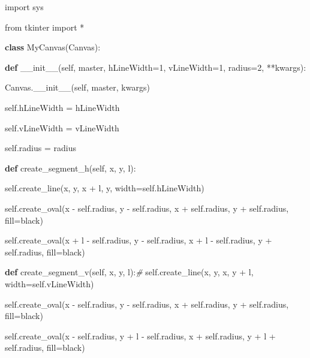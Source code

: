 \documentclass[
]{article}
\author{}
\date{}
\newenvironment{Shaded}{}{}
\newcommand{\CommentTok}[1]{\textcolor[rgb]{0.38,0.63,0.69}{\textit{#1}}}
\newcommand{\DecValTok}[1]{\textcolor[rgb]{0.25,0.63,0.44}{#1}}
\newcommand{\FunctionTok}[1]{\textcolor[rgb]{0.02,0.16,0.49}{#1}}
\newcommand{\ImportTok}[1]{#1}
\newcommand{\KeywordTok}[1]{\textcolor[rgb]{0.00,0.44,0.13}{\textbf{#1}}}
\newcommand{\NormalTok}[1]{#1}
\newcommand{\OperatorTok}[1]{\textcolor[rgb]{0.40,0.40,0.40}{#1}}
\newcommand{\StringTok}[1]{\textcolor[rgb]{0.25,0.44,0.63}{#1}}
\newcommand{\VariableTok}[1]{\textcolor[rgb]{0.10,0.09,0.49}{#1}}
\begin{document}
\begin{Shaded}
\begin{Highlighting}[]
\ImportTok{import}\NormalTok{ sys
}
\ImportTok{from}\NormalTok{ tkinter }\ImportTok{import} \OperatorTok{*}



\KeywordTok{class}\NormalTok{ MyCanvas(Canvas):
}
    \KeywordTok{def} \FunctionTok{\_\_init\_\_}\NormalTok{(}\VariableTok{self}\NormalTok{, master, hLineWidth}\OperatorTok{=}\DecValTok{1}\NormalTok{, vLineWidth}\OperatorTok{=}\DecValTok{1}\NormalTok{, radius}\OperatorTok{=}\DecValTok{2}\NormalTok{, }\OperatorTok{**}\NormalTok{kwargs):
}
\NormalTok{        Canvas.}\FunctionTok{\_\_init\_\_}\NormalTok{(}\VariableTok{self}\NormalTok{, master, kwargs)
}
        \VariableTok{self}\NormalTok{.hLineWidth }\OperatorTok{=}\NormalTok{ hLineWidth
}
        \VariableTok{self}\NormalTok{.vLineWidth }\OperatorTok{=}\NormalTok{ vLineWidth
}
        \VariableTok{self}\NormalTok{.radius }\OperatorTok{=}\NormalTok{ radius
}


    \KeywordTok{def}\NormalTok{ create\_segment\_h(}\VariableTok{self}\NormalTok{, x, y, l):
}
        \VariableTok{self}\NormalTok{.create\_line(x, y, x }\OperatorTok{+}\NormalTok{ l, y, width}\OperatorTok{=}\VariableTok{self}\NormalTok{.hLineWidth)
}
        \VariableTok{self}\NormalTok{.create\_oval(x }\OperatorTok{{-}} \VariableTok{self}\NormalTok{.radius, y }\OperatorTok{{-}} \VariableTok{self}\NormalTok{.radius, x }\OperatorTok{+} \VariableTok{self}\NormalTok{.radius, y }\OperatorTok{+} \VariableTok{self}\NormalTok{.radius, fill}\OperatorTok{=}\StringTok{\textquotesingle{}black\textquotesingle{}}\NormalTok{)
}
        \VariableTok{self}\NormalTok{.create\_oval(x }\OperatorTok{+}\NormalTok{ l }\OperatorTok{{-}} \VariableTok{self}\NormalTok{.radius, y }\OperatorTok{{-}} \VariableTok{self}\NormalTok{.radius, x }\OperatorTok{+}\NormalTok{ l }\OperatorTok{{-}} \VariableTok{self}\NormalTok{.radius, y }\OperatorTok{+} \VariableTok{self}\NormalTok{.radius, fill}\OperatorTok{=}\StringTok{\textquotesingle{}black\textquotesingle{}}\NormalTok{)
}


    \KeywordTok{def}\NormalTok{ create\_segment\_v(}\VariableTok{self}\NormalTok{, x, y, l):}\CommentTok{\#
}
        \VariableTok{self}\NormalTok{.create\_line(x, y, x, y }\OperatorTok{+}\NormalTok{ l, width}\OperatorTok{=}\VariableTok{self}\NormalTok{.vLineWidth)
}
        \VariableTok{self}\NormalTok{.create\_oval(x }\OperatorTok{{-}} \VariableTok{self}\NormalTok{.radius, y }\OperatorTok{{-}} \VariableTok{self}\NormalTok{.radius, x }\OperatorTok{+} \VariableTok{self}\NormalTok{.radius, y }\OperatorTok{+} \VariableTok{self}\NormalTok{.radius, fill}\OperatorTok{=}\StringTok{\textquotesingle{}black\textquotesingle{}}\NormalTok{)
}
        \VariableTok{self}\NormalTok{.create\_oval(x }\OperatorTok{{-}} \VariableTok{self}\NormalTok{.radius, y }\OperatorTok{+}\NormalTok{ l }\OperatorTok{{-}} \VariableTok{self}\NormalTok{.radius, x }\OperatorTok{+} \VariableTok{self}\NormalTok{.radius, y }\OperatorTok{+}\NormalTok{ l }\OperatorTok{+} \VariableTok{self}\NormalTok{.radius, fill}\OperatorTok{=}\StringTok{\textquotesingle{}black\textquotesingle{}}\NormalTok{)
}



\end{Highlighting}
\end{Shaded}
\end{document}
